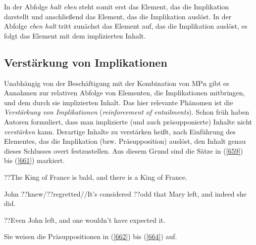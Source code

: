 In der Abfolge \textit{halt eben} steht somit erst das Element, das die Implikation darstellt und anschließend das Element, das die Implikation auslöst. In der Abfolge \textit{eben halt} tritt zunächst das Element auf, das die Implikation auslöst, es folgt das Element mit dem implizierten Inhalt.

\subsection{Verstärkung von Implikationen}
\label{sec:verstimpli}
Unabhängig von der Beschäftigung mit der Kombination von MPn gibt es Annahmen zur relativen Abfolge von Elementen, die Implikationen mitbringen, und dem durch sie implizierten Inhalt. Das hier relevante Phänomen ist die \textit{Verstärkung von Implikationen} (\textit{reinforcement of entailments}). Schon früh haben Autoren formuliert, dass man implizierte  (und auch präsupponierte)  Inhalte nicht \textit{verstärken} kann. Derartige Inhalte zu verstärken heißt, nach Einführung des Elementes, das die Implikation  (bzw. Präsupposition)  auslöst, den Inhalt genau dieses Schlusses overt festzustellen. Aus diesem Grund sind die Sätze in (\ref{659}) bis (\ref{661}) markiert.

\begin{exe}
	\ex\label{659} 
	??The King of France is bald, and there is a King of France.
\end{exe}
\vspace{-0.65cm}
\begin{exe}
	\ex\label{660} 
	John ??knew/??regretted//It’s considered ??odd that Mary left, and indeed she did.
\end{exe}
\vspace{-0.65cm}
\begin{exe}
	\ex\label{661} 
	??Even John left, and one wouldn’t have expected it. 
	\hfill\hbox {\citet[64/64/66]{Horn1976}}
\end{exe}											         
Sie weisen die Präsuppositionen in (\ref{662}) bis (\ref{664}) auf.


